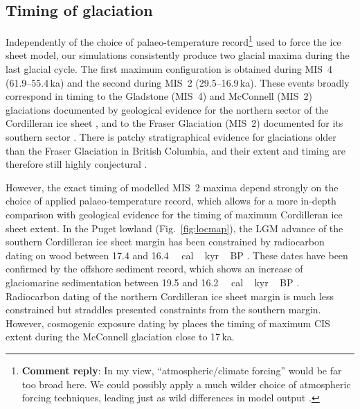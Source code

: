 \documentclass[tc, manuscript]{copernicus}
\newcommand{\renote}[1]{\footnote{\textbf{Comment reply}: #1}}
\begin{document}
\subsection{Timing of glaciation}

Independently of the choice of palaeo-temperature record\renote{
    In my view, ``atmospheric/climate forcing'' would be far too broad here. We
    could possibly apply a much wilder choice of atmospheric forcing
    techniques, leading just as wild differences in model output
    \citep[e.g.,][but possibly much more than that]{Seguinot.etal.2014}.}
used to force the ice sheet model, our simulations consistently produce two
glacial maxima during the last glacial cycle. The first maximum configuration
is obtained during MIS~4 (61.9--55.4\,ka) and the second during MIS~2
(29.5--16.9\,ka). These events broadly correspond in timing to the Gladstone
(MIS~4) and McConnell (MIS~2) glaciations documented by geological evidence for
the northern sector of the Cordilleran ice sheet
    \citep{Duk-Rodkin.etal.1996, Ward.etal.2007,
           Stroeven.etal.2010, Stroeven.etal.2014},
and to the Fraser Glaciation (MIS~2) documented for its southern sector
    \citep{Porter.Swanson.1998, Margold.etal.2014}.
There is patchy stratigraphical evidence for glaciations older than the Fraser
Glaciation \citep{Clague.Ward.2011} in British Columbia, and their extent and
timing are therefore still highly conjectural
    \citep[perhaps MIS~4 or early MIS~3; e.g.,][]{Cosma.etal.2008}.

However, the exact timing of modelled MIS~2 maxima depend strongly on the
choice of applied palaeo-temperature record, which allows for a more in-depth
comparison with geological evidence for the timing of maximum Cordilleran ice
sheet extent. In the Puget lowland (Fig.~\ref{fig:locmap}), the LGM advance of
the southern Cordilleran ice sheet margin has been constrained by radiocarbon
dating on wood between 17.4 and 16.4\,\unit{\,cal\,kyr\,BP}
\citep{Porter.Swanson.1998}.
These dates have been confirmed by the offshore sediment record, which shows an
increase of glaciomarine sedimentation between 19.5 and
16.2\,\unit{\,cal\,kyr\,BP} \citep{Cosma.etal.2008}. Radiocarbon
dating of the northern Cordilleran ice sheet margin is much less constrained
but straddles presented constraints from the southern margin. However,
cosmogenic exposure dating by \citep{Stroeven.etal.2010, Stroeven.etal.2014}
places the timing of maximum CIS extent during the McConnell glaciation close
to 17\,ka.
\end{document}
